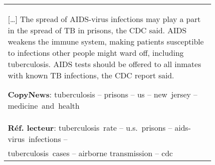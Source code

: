 \begin{figure}
{\begin{tabular}{|p{}|}
    [\ldots]
    The spread of \textcolor{color3}{AIDS-virus} \textcolor{color0}{infections} may play a part in the spread of TB in \textcolor{color6}{prisons}, the \textcolor{color5}{CDC} said.
    AIDS weakens the immune system, making patients susceptible to \textcolor{color0}{infections} other people might ward off, including \textcolor{color4}{tuberculosis}.
    AIDS tests should be offered to all inmates with known TB \textcolor{color0}{infections}, the \textcolor{color5}{CDC} report said.

    \vspace{1.1em}
    
    \textbf{CopyNews}: \textcolor{color4}{tuberculosis}\phantom{~rate} -- \textcolor{color6}{prisons} -- \textcolor{color7}{us} -- \textcolor{color2}{new~jersey} --  medicine~and~\textcolor{color2}{health} \\
    \textbf{Réf. lecteur}: \textcolor{color4}{tuberculosis}~\textcolor{color8}{rate} -- \textcolor{color7}{u.s}.~\textcolor{color6}{prisons} -- \textcolor{color3}{aids-virus}~\textcolor{color0}{infections} --
    \\
    \phantom{\textbf{Réf. lecteur}:}
    \textcolor{color4}{tuberculosis}~\textcolor{color1}{cases} --
    \textcolor{color9}{airborne transmission} --  \textcolor{color5}{cdc}
    \vspace{0.2em}


    \end{tabular}%
    }
    \label{fig:ex_kptimes_duc}
\end{figure}
